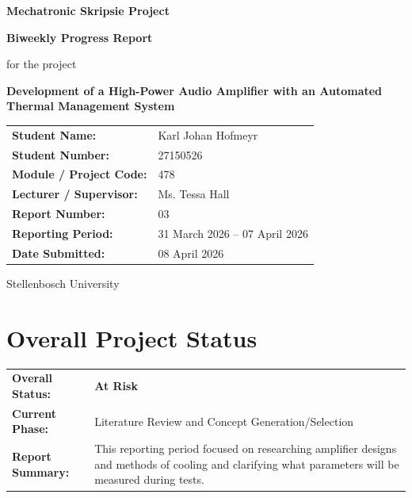\documentclass[11pt,a4paper]{article}
\newcommand{\projecttitle}{Development of a High-Power Audio Amplifier with an Automated Thermal Management System}
\newcommand{\studentname}{Karl Johan Hofmeyr}
\newcommand{\studentnumber}{27150526}
\newcommand{\modulecode}{478}
\newcommand{\lecturer}{Ms. Tessa Hall}
\newcommand{\departmentname}{Mechatronic Skripsie Project}
\newcommand{\reportnumber}{03}
\newcommand{\reportingperiod}{31 March 2026 -- 07 April 2026}
\newcommand{\submissiondate}{08 April 2026}
\newcommand{\atrisk}{\textcolor{orange!90!black}{\textbf{At Risk}}}
\begin{document}
	
	\begin{titlepage}
		\centering
		\vspace*{2cm}
		
		{\Large \textbf{\departmentname} \par}
		\vspace{1.5cm}
		
		{\LARGE \textbf{Biweekly Progress Report} \par}
		\vspace{0.8cm}
		
		{\large for the project \par}
		\vspace{0.3cm}
		
		{\Large \textbf{\projecttitle} \par}
		\vspace{2cm}
		
		\begin{tabular}{>{\bfseries}p{5cm} p{8.5cm}}
			Student Name: & \studentname \\
			Student Number: & \studentnumber \\
			Module / Project Code: & \modulecode \\
			Lecturer / Supervisor: & \lecturer \\
			Report Number: & \reportnumber \\
			Reporting Period: & \reportingperiod \\
			Date Submitted: & \submissiondate \\
		\end{tabular}
		
		\vfill
		
		{\large Stellenbosch University \par}
	\end{titlepage}
	
	\section{Overall Project Status}
	
	\begin{tabular}{>{\bfseries}p{5cm} p{10cm}}
		Overall Status: & \atrisk \\[0.2cm]
		Current Phase: & Literature Review and Concept Generation/Selection \\[0.2cm]
		Report Summary: & This reporting period focused on researching amplifier designs and methods of cooling and clarifying what parameters will be measured during tests.
	\end{tabular}
	
\end{document}
